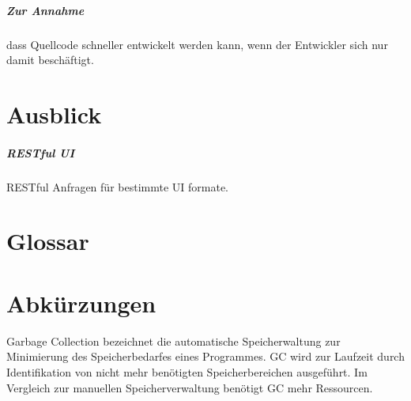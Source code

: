 \documentclass[
12pt,
english,
ngerman,
headsepline,
twoside,
openright,
numbers=noenddot,version=first
]{scrreprt}
\begin{document}
\paragraph{Zur Annahme} dass Quellcode schneller entwickelt werden kann, wenn der Entwickler sich nur damit beschäftigt.

\chapter{Ausblick}



\paragraph{RESTful UI}
RESTful Anfragen für bestimmte UI formate.

\lstlistoflistings


\listoftables



\chapter*{Glossar}

\printglossary[type=\acronymtype]




\chapter*{Abkürzungen}


\begin{acronym}[Bash]



\glqq Garbage Collection\grqq{} bezeichnet die automatische Speicherwaltung zur Minimierung des Speicherbedarfes eines Programmes.
\ac{GC} wird zur Laufzeit durch Identifikation von nicht mehr benötigten Speicherbereichen ausgeführt.
Im Vergleich zur manuellen Speicherverwaltung benötigt \ac{GC} mehr Ressourcen.

\end{acronym}



\end{document}
